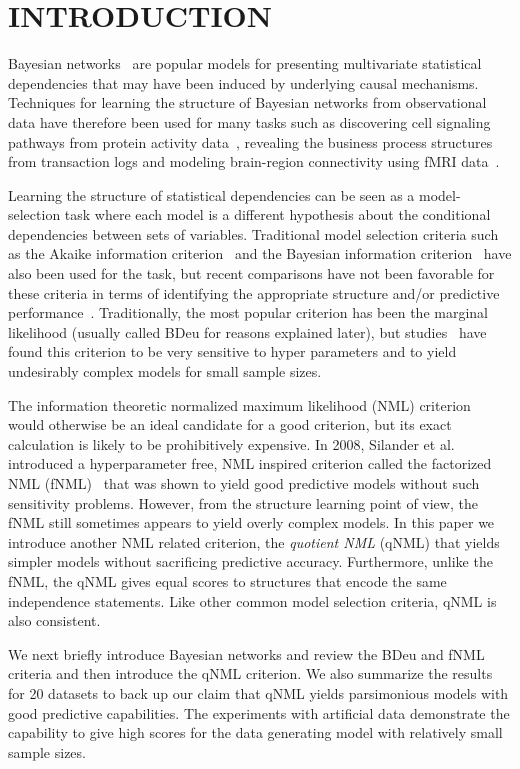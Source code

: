 \section{INTRODUCTION}
\label{sec:intro}
Bayesian networks~\cite{Pear88} are popular models for presenting
multivariate statistical dependencies that may have been induced by
underlying causal mechanisms.  Techniques for learning the structure
of Bayesian networks from observational data have therefore been used
for many tasks such as discovering cell signaling pathways from
protein activity data~\cite{bn4sigpath02}, revealing the business
process structures~\cite{bn4bpmining} from transaction logs and
modeling brain-region connectivity using fMRI
data~\cite{bn4brainconnect}.

Learning the structure of statistical dependencies can be seen as a
model-selection task where each model is a different hypothesis about
the conditional dependencies between sets of variables. Traditional
model selection criteria such as the Akaike information
criterion~\cite{Akai73} and the Bayesian information
criterion~\cite{Schw78} have also been used for the task, but recent
comparisons have not been favorable for these criteria in terms of
identifying the appropriate structure and/or predictive
performance~\cite{cosco.pgm08a}. Traditionally, the most popular
criterion has been the marginal likelihood (usually called BDeu for
reasons explained later), but studies~\cite{cosco.uai07,Steck08}
have found this criterion to be very sensitive to hyper parameters
and to yield undesirably complex models for small sample sizes.

The information theoretic normalized maximum likelihood (NML)
criterion~\cite{Shta87,Riss96a} would otherwise be an ideal candidate
for a good criterion, but its exact calculation is likely to be
prohibitively expensive. In 2008, Silander et al. introduced a
hyperparameter free, NML inspired criterion called the factorized NML
(fNML)~\cite{cosco.pgm08a} that was shown to yield good predictive
models without such sensitivity problems. However, from the structure
learning point of view, the fNML still sometimes appears to yield
overly complex models. In this paper we introduce another NML related
criterion, the \textit{quotient NML} (qNML) that yields simpler models
without sacrificing predictive accuracy. Furthermore, unlike the fNML,
the qNML gives equal scores to structures that encode the same
independence statements. Like other common model selection criteria,
qNML is also consistent.

We next briefly introduce Bayesian networks and review the BDeu and
fNML criteria and then introduce the qNML criterion.  We also
summarize the results for 20 datasets to back up our claim that qNML
yields parsimonious models with good predictive capabilities. The
experiments with artificial data demonstrate the capability to give
high scores for the data generating model with relatively small sample
sizes.

